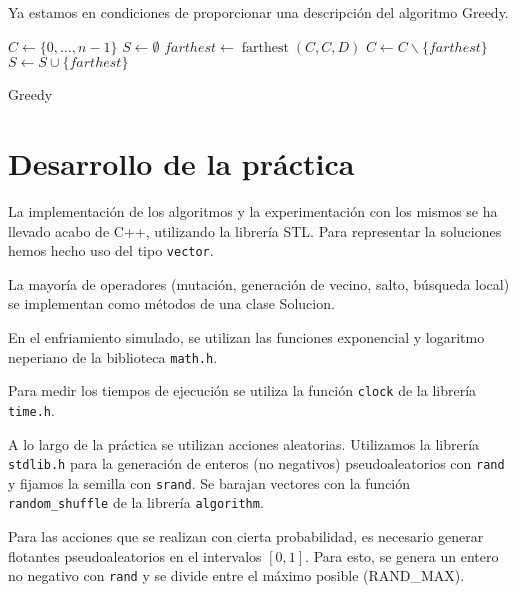 \documentclass{article}
\begin{document}
Ya estamos en condiciones de proporcionar una descripción del algoritmo Greedy.

\begin{algorithm}[H]
	\DontPrintSemicolon %
	$C \gets \{0,\ldots, n-1\}$ 
	$S \gets \emptyset$ 
	$farthest \gets \operatorname{farthest}(C,C,D)$ 
	$C \gets C\backslash \{farthest\}$\;
	$S \gets S\cup \{farthest\}$\;
	\;
	\;
	\caption{{\sc Greedy}}
	\label{alg:greedy}
\end{algorithm}

\pagebreak

\section{Desarrollo de la práctica}

La implementación de los algoritmos y la experimentación con los mismos se ha llevado acabo de C++, utilizando la librería STL. 
Para representar la soluciones hemos hecho uso del tipo \texttt{vector}.

La mayoría de operadores (mutación, generación de vecino, salto, búsqueda local) se implementan como métodos de una 
clase Solucion.

En el enfriamiento simulado, se utilizan las funciones exponencial y logaritmo neperiano de la biblioteca \texttt{math.h}.

Para medir los tiempos de ejecución se utiliza la función \texttt{clock} de la librería \texttt{time.h}.

A lo largo de la práctica se utilizan acciones aleatorias. Utilizamos la librería \texttt{stdlib.h} para la generación de
enteros (no negativos) pseudoaleatorios con \texttt{rand} y fijamos la semilla con \texttt{srand}. Se barajan vectores con la función
 \texttt{random\_shuffle} de la librería \texttt{algorithm}.
 
Para las acciones que se realizan con cierta probabilidad, es necesario generar flotantes pseudoaleatorios en el intervalos $[0,1]$.
Para esto, se genera un entero no negativo con \texttt{rand} y se divide entre el máximo posible (RAND\_MAX).
\end{document}

